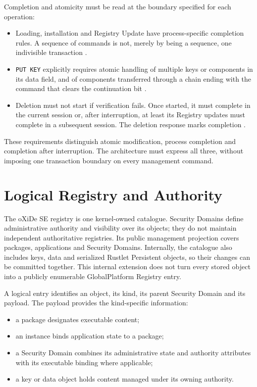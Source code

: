 Completion and atomicity must be read at the boundary specified for each
operation:
\begin{itemize}
\item Loading, installation and Registry Update have process-specific
  completion rules. A sequence of commands is not, merely by being a
  sequence, one indivisible transaction .
\item \texttt{PUT KEY} explicitly requires atomic handling of multiple keys
  or components in its data field, and of components transferred through a
  chain ending with the command that clears the continuation bit
  .
\item Deletion must not start if verification fails. Once started, it must
  complete in the current session or, after interruption, at least its
  Registry updates must complete in a subsequent session. The deletion
  response marks completion .
\end{itemize}

These requirements distinguish atomic modification, process completion and
completion after interruption. The architecture must express all three,
without imposing one transaction boundary on every management command.

\section{Logical Registry and Authority}
\label{sec:registry-logical-contract}

The oXiDe SE registry is one kernel-owned catalogue. Security Domains define
administrative authority and visibility over its objects; they do not maintain
independent authoritative registries. Its public management projection covers
packages, applications and Security Domains. Internally, the catalogue also
includes keys, data and serialized Rustlet Persistent objects, so their changes can be
committed together. This internal extension does not turn every stored object
into a publicly enumerable GlobalPlatform Registry entry.

A logical entry identifies an object, its kind, its parent Security Domain
and its payload. The payload provides the kind-specific information:
\begin{itemize}
\item a package designates executable content;
\item an instance binds application state to a package;
\item a Security Domain combines its administrative state and authority
  attributes with its executable binding where applicable;
\item a key or data object holds content managed under its owning authority.
\end{itemize}

